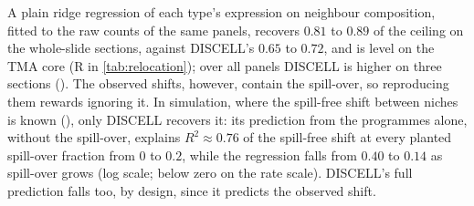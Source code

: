A plain ridge regression of each type's expression on neighbour composition, fitted to the raw counts of the same panels, recovers $0.81$ to $0.89$ of the ceiling on the whole-slide sections, against DISCELL's $0.65$ to $0.72$, and is level on the TMA core (R in \cref{tab:relocation}); over all panels DISCELL is higher on three sections (). The observed shifts, however, contain the spill-over, so reproducing them rewards ignoring it. In simulation, where the spill-free shift between niches is known (), only DISCELL recovers it: its prediction from the programmes alone, without the spill-over, explains $R^2 \approx 0.76$ of the spill-free shift at every planted spill-over fraction from $0$ to $0.2$, while the regression falls from $0.40$ to $0.14$ as spill-over grows (log scale; below zero on the rate scale). DISCELL's full prediction falls too, by design, since it predicts the observed shift.
